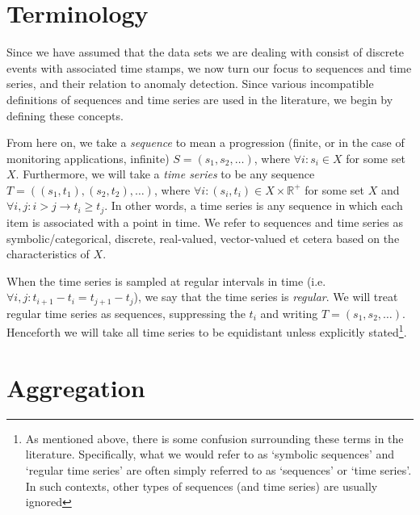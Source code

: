 \section{Terminology}
\label{sect:terminology}

Since we have assumed that the data sets we are dealing with consist of discrete events with associated time stamps, we now turn our focus to sequences and time series, and their relation to anomaly detection. Since various incompatible definitions of sequences and time series are used in the literature, we begin by defining these concepts.

From here on, we take a \emph{sequence} to mean a progression (finite, or in the case of monitoring applications, infinite) $S = (s_1, s_2, \dots)$, where $\forall i: s_i \in X$ for some set $X$. Furthermore, we will take a \emph{time series} to be any sequence $T = ((s_1, t_1), (s_2, t_2), \dots)$, where $\forall i: (s_i, t_i) \in X \times \mathbb{R}^+$ for some set $X$ and $\forall i, j: i > j \rightarrow t_i \geq t_j$. In other words, a time series is any sequence in which each item is associated with a point in time. We refer to sequences and time series as symbolic/categorical, discrete, real-valued, vector-valued et cetera based on the characteristics of $X$.

When the time series is sampled at regular intervals in time (i.e.\ $\forall i, j: t_{i+1} - t_i = t_{j+1} - t_j$), we say that the time series is \emph{regular}. We will treat regular time series as sequences, suppressing the $t_i$ and writing $T = (s_1, s_2, \dots)$. Henceforth we will take all time series to be equidistant unless explicitly stated\footnote{As mentioned above, there is some confusion surrounding these terms in the literature. Specifically, what we would refer to as `symbolic sequences' and `regular time series' are often simply referred to as `sequences' or `time series'. In such contexts, other types of sequences (and time series) are usually ignored}.

\section{Aggregation}
\label{sect:aggregation}

